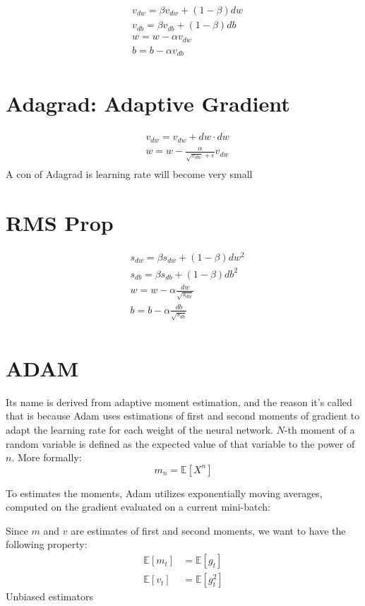 \begin{align*}
    &v_{dw} = \beta v_{dw} + (1-\beta)dw \\
    &v_{db} = \beta v_{db} + (1-\beta)db \\
    & w = w-\alpha v_{dw}\\
    & b = b-\alpha v_{db}\\
\end{align*}

\section{Adagrad: Adaptive Gradient}
\begin{align*}
    &v_{dw} = v_{dw} + dw \cdot dw \\
	& w = w-\frac{\alpha}{\sqrt{v_{dw}}+\epsilon} v_{dw}\\
\end{align*}
A con of Adagrad is learning rate will become very small


\section{RMS Prop}

\begin{align*}
    &s_{dw} = \beta s_{dw} + (1-\beta)dw^2 \\
    &s_{db} = \beta s_{db} + (1-\beta)db^2 \\
	& w = w-\alpha  \frac{dw}{\sqrt{s_{dw}}}\\
	& b = b-\alpha \frac{db}{\sqrt{s_{db}}} \\
\end{align*}

\section{ADAM}
Its name is derived from adaptive moment estimation, and the reason it's called that is because Adam uses estimations of first and second moments of gradient to adapt the learning rate for each weight of the neural network. $N$-th moment of a random variable is defined as the expected value of that variable to the power of $n$. More formally:
$$m_n = \mathbb{E}[X^n]$$

To estimates the moments, Adam utilizes exponentially moving averages, computed on the gradient evaluated on a current mini-batch:

Since $m$ and $v$ are estimates of first and second moments, we want to have the following property:
\begin{align}
	\mathbb{E}[m_t] &= \mathbb{E}[g_t]\\
	\mathbb{E}[v_t] &= \mathbb{E}[g_t^2]
\end{align}
Unbiased estimators

